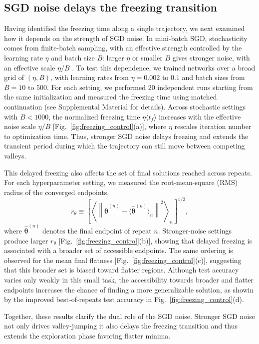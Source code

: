 \documentclass[aps,prx,reprint,superscriptaddress,longbibliography,nofootinbib,floatfix]{revtex4-2}
\begin{document}
\subsection{SGD noise delays the freezing transition}
Having identified the freezing time along a single trajectory, we next examined how it depends on the strength of SGD noise. In mini-batch SGD, stochasticity comes from finite-batch sampling, with an effective strength controlled by the learning rate $\eta$ and batch size $B$: larger $\eta$ or smaller $B$ gives stronger noise, with an effective scale $\eta/B$ \cite{jastrzebskiThreeFactorsInfluencing2018}. To test this dependence, we trained networks over a broad grid of $(\eta,B)$, with learning rates from $\eta=0.002$ to $0.1$ and batch sizes from $B=10$ to $500$. For each setting, we performed 20 independent runs starting from the same initialization and measured the freezing time using matched continuation (see Supplemental Material for details). Across stochastic settings with $B<1000$, the normalized freezing time $\eta \langle t_f \rangle$ increases with the effective noise scale $\eta/B$ [Fig.~\ref{fig:freezing_control}(a)], where $\eta$ rescales iteration number to optimization time. Thus, stronger SGD noise delays freezing and extends the transient period during which the trajectory can still move between competing valleys.

This delayed freezing also affects the set of final solutions reached across repeats. For each hyperparameter setting, we measured the root-mean-square (RMS) radius of the converged endpoints,
\begin{equation} r_\theta \equiv \left[ \left\langle \left\| \hat{\bm{\theta}}^{(n)} - \langle\hat{\bm{\theta}}^{(n)}\rangle_n \right\|^2 \right\rangle_n \right]^{1/2}, 
\end{equation}
where $\hat{\bm{\theta}}^{(n)}$ denotes the final endpoint of repeat $n$. Stronger-noise settings produce larger $r_\theta$ [Fig.~\ref{fig:freezing_control}(b)], showing that delayed freezing is associated with a broader set of accessible endpoints. The same ordering is observed for the mean final flatness [Fig.~\ref{fig:freezing_control}(c)], suggesting that this broader set is biased toward flatter regions. Although test accuracy varies only weakly in this small task, the accessibility towards broader and flatter endpoints increases the chance of finding a more generalizable solution, as showin by the improved best-of-repeats test accuracy in Fig.~\ref{fig:freezing_control}(d).

Together, these results clarify the dual role of the SGD noise. Stronger SGD noise not only drives valley-jumping it also delays the freezing transition and thus extends the exploration phase favoring flatter minima.
\end{document}
